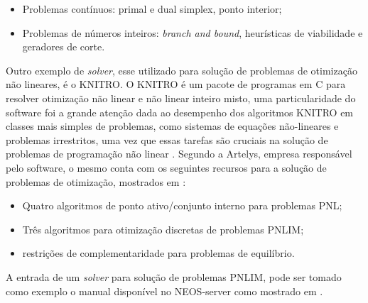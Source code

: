 \begin{itemize}
    \item Problemas contínuos: primal e dual simplex, ponto interior;
    
    \item Problemas de números inteiros: \textit{branch and bound}, heurísticas de viabilidade e geradores de corte.
\end{itemize}

Outro exemplo de \emph{solver}, esse utilizado para solução de problemas de otimização não lineares, é o KNITRO.
O KNITRO é um pacote de programas em C para resolver otimização não linear e não linear inteiro misto, uma particularidade do software foi a grande atenção dada ao desempenho dos algoritmos KNITRO em classes mais simples de problemas, como sistemas de equações não-lineares e problemas irrestritos, uma vez que essas tarefas são cruciais na solução de problemas de programação não linear \cite{Byrd2006Knitro:Optimization}.
Segundo a Artelys, empresa responsável pelo software, o mesmo conta com os seguintes recursos para a solução de problemas de otimização, mostrados em \cite{knitroweb}:

\begin{itemize}
    \item Quatro algoritmos de ponto ativo/conjunto interno para problemas PNL;
    
    \item Três algoritmos para otimização discretas de problemas PNLIM;
    
    \item restrições de complementaridade para problemas de equilíbrio.
\end{itemize}

A entrada de um \emph{solver} para solução de problemas PNLIM, pode ser tomado como exemplo o manual disponível no NEOS-server como mostrado em \cite{neosguide}.

